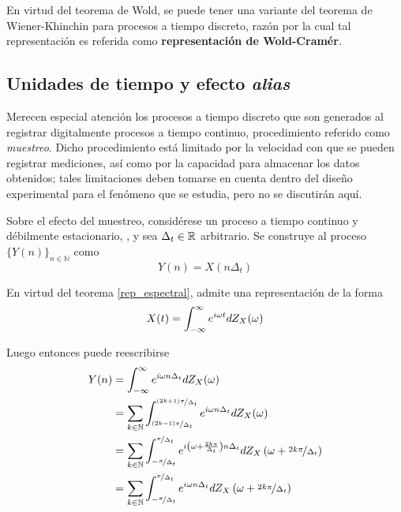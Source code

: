 En virtud del teorema de Wold, se puede tener una variante del teorema de Wiener-Khinchin
para procesos a tiempo discreto, razón por la cual  
tal representación es referida como \textbf{representación de Wold-Cramér}.


\subsection{Unidades de tiempo y efecto \textit{alias}}

Merecen especial atención los procesos a tiempo discreto que son generados al registrar 
digitalmente procesos a tiempo continuo, procedimiento referido como \textit{muestreo}.
%
Dicho procedimiento está limitado por la velocidad con que se pueden registrar mediciones, así 
como por la capacidad para almacenar los datos obtenidos; tales limitaciones deben tomarse en 
cuenta dentro del diseño experimental para el fenómeno que se estudia, pero no se discutirán aquí.

Sobre el efecto del muestreo, considérese un proceso a tiempo continuo y débilmente estacionario, 
\xt, y sea $\Delta_t \in \mathbb{R}$ arbitrario.
%
Se construye al proceso $\{Y(n)\}_{n\in \mathbb{N}}$ como
\begin{equation}
Y(n) = X(n \Delta_t)
\end{equation}

En virtud del teorema \ref{rep_espectral}, \xt admite una representación de la forma
\begin{equation}
X(t) = \int_{-\infty}^{\infty} e^{i \omega t }  dZ_X(\omega)
\end{equation}

Luego entonces puede reescribirse
\begin{align}
Y(n) &= \int_{-\infty}^{\infty} e^{i \omega n \Delta_t} dZ_X(\omega) \nonumber \\
&= \sum_{k \in \mathbb{N}} \int_{\nicefrac{(2k-1)\pi}{\Delta_t}}^{\nicefrac{(2k+1)\pi}{\Delta_t}}
e^{i \omega n \Delta_t} dZ_X(\omega) \nonumber \\
&= \sum_{k \in \mathbb{N}} \int_{-\nicefrac{\pi}{\Delta_t}}^{\nicefrac{\pi}{\Delta_t}}
e^{i \left( \omega + \frac{2 k \pi}{\Delta_t} \right) n \Delta_t}
dZ_X\left( \omega + \nicefrac{2 k \pi}{\Delta_t}\right) \nonumber \\
&= \sum_{k \in \mathbb{N}} \int_{-\nicefrac{\pi}{\Delta_t}}^{\nicefrac{\pi}{\Delta_t}}
e^{i \omega n \Delta_t}
dZ_X\left( \omega + \nicefrac{2 k \pi}{\Delta_t}\right)
\end{align}

